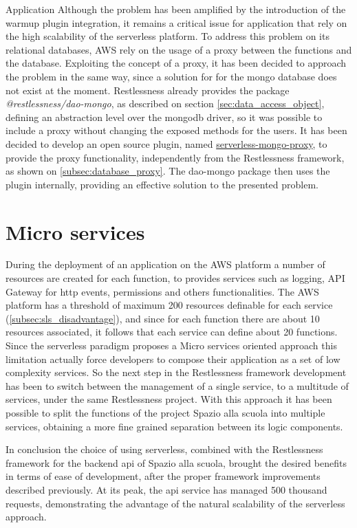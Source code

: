 \begin{chapter}{Application}
    Although the problem has been amplified by the introduction of the warmup plugin
    integration, it remains a critical issue for application that rely on the high
    scalability of the serverless platform.
    To address this problem on its relational databases, AWS rely on the usage of a
    proxy between the functions and the database. Exploiting the concept of a proxy,
    it has been decided to approach the problem in the same way, since a solution for
    for the mongo database does not exist at the moment.
    Restlessness already provides the package \textit{@restlessness/dao-mongo}, as
    described on section \ref{sec:data_access_object}, defining an abstraction level
    over the mongodb driver, so it was possible to include a proxy without changing
    the exposed methods for the users.
    It has been decided to develop an open source plugin, named
    \href{https://github.com/getapper/serverless-mongo-proxy}{serverless-mongo-proxy},
    to provide the proxy functionality, independently from the Restlessness framework,
    as shown on \ref{subsec:database_proxy}.
    The dao-mongo package then uses the plugin internally, providing an effective
    solution to the presented problem.

    \section{Micro services}
    \label{subsec:application_micro_services}
    During the deployment of an application on the AWS platform a number of resources
    are created for each function, to provides services such as logging, API Gateway
    for http events, permissions and others functionalities. The AWS platform has a
    threshold of maximum 200 resources definable for each service
    (\ref{subsec:sls_disadvantage}), and since for each function there are about 10
    resources associated, it follows that each service can define about 20 functions.
    Since the serverless paradigm proposes a Micro services oriented approach this
    limitation actually force developers to compose their application as a set of
    low complexity services.
    So the next step in the Restlessness framework development has been to switch
    between the management of a single service, to a multitude of services, under
    the same Restlessness project. With this approach it has been possible to split
    the functions of the project Spazio alla scuola into multiple services, obtaining
    a more fine grained separation between its logic components.

    \bigbreak
    In conclusion the choice of using serverless, combined with the Restlessness
    framework for the backend api of Spazio alla scuola, brought the desired benefits
    in terms of ease of development, after the proper framework improvements described
    previously. At its peak, the api service has managed 500 thousand requests,
    demonstrating the advantage of the natural scalability of the serverless approach.

\end{chapter}
